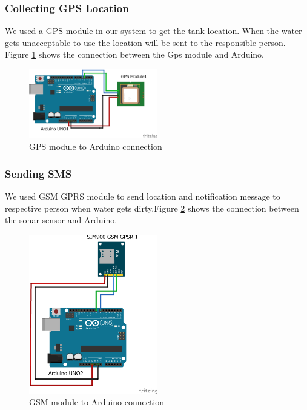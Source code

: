 \subsubsection*{Collecting GPS Location}
We used a GPS module in our system to get the tank location. When the water gets unacceptable to use the location will be sent to the responsible person. Figure \ref{GpsModule1} shows the connection between the Gps module and Arduino.
\begin{figure}[H]
\centering
\includegraphics[width=0.5\textwidth]{figures/gps_bb.png}
\caption{GPS module to Arduino connection}
\label{GpsModule1}
\end{figure}



\subsubsection*{Sending SMS}
We used GSM GPRS module to send location and notification message to respective person when water gets dirty.Figure \ref{GSMMod} shows the connection between the sonar sensor and Arduino.

\begin{figure}[H]
\centering
\includegraphics[width=0.5\textwidth]{figures/sim_bb.png}
\caption{GSM module to Arduino connection}
\label{GSMMod}
\end{figure}


